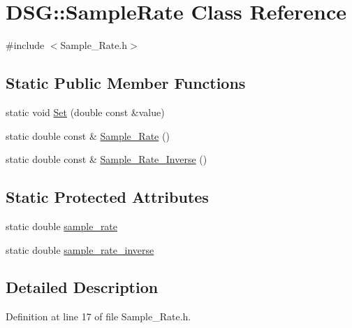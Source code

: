 \hypertarget{classDSG_1_1SampleRate}{\section{D\+S\+G\+:\+:Sample\+Rate Class Reference}
\label{classDSG_1_1SampleRate}
}


{\ttfamily \#include $<$Sample\+\_\+\+Rate.\+h$>$}

\subsection*{Static Public Member Functions}
\begin{DoxyCompactItemize}
\item 
static void \hyperlink{classDSG_1_1SampleRate_a20fbf652a8b305df17940d64ca3593a8}{Set} (double const \&value)
\item 
static double const \& \hyperlink{classDSG_1_1SampleRate_ae64b5675efed1e2b8627fbe407b8cb91}{Sample\+\_\+\+Rate} ()
\item 
static double const \& \hyperlink{classDSG_1_1SampleRate_ab7f5b3d837151019b5bc0642b3337bd8}{Sample\+\_\+\+Rate\+\_\+\+Inverse} ()
\end{DoxyCompactItemize}
\subsection*{Static Protected Attributes}
\begin{DoxyCompactItemize}
\item 
static double \hyperlink{classDSG_1_1SampleRate_a09608252c62dcf0f0437f64f93324e57}{sample\+\_\+rate}
\item 
static double \hyperlink{classDSG_1_1SampleRate_a17f5dfa529560272a0c9c917e3e2a41f}{sample\+\_\+rate\+\_\+inverse}
\end{DoxyCompactItemize}


\subsection{Detailed Description}


Definition at line 17 of file Sample\+\_\+\+Rate.\+h.



